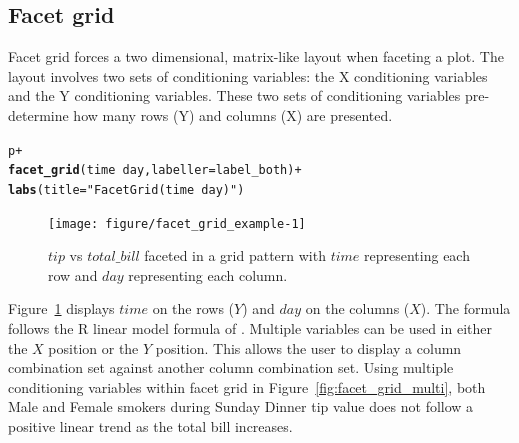 \documentclass[stat,dissertation]{puthesis}\usepackage[]{graphicx}\usepackage{xcolor}
\makeatletter
\newcommand{\hlstr}[1]{\textcolor[rgb]{0.192,0.494,0.8}{#1}}%
\newcommand{\hlopt}[1]{\textcolor[rgb]{0,0,0}{#1}}%
\newcommand{\hlstd}[1]{\textcolor[rgb]{0.345,0.345,0.345}{#1}}%
\newcommand{\hlkwc}[1]{\textcolor[rgb]{0.333,0.667,0.333}{#1}}%
\newcommand{\hlkwd}[1]{\textcolor[rgb]{0.737,0.353,0.396}{\textbf{#1}}}%
\newenvironment{kframe}{%
 \def\at@end@of@kframe{}%
 \ifinner\ifhmode%
  \def\at@end@of@kframe{\end{minipage}}%
  \begin{minipage}{\columnwidth}%
 \fi\fi%
 \def\FrameCommand##1{\hskip\@totalleftmargin \hskip-\fboxsep
 \colorbox{shadecolor}{##1}\hskip-\fboxsep
     \hskip-\linewidth \hskip-\@totalleftmargin \hskip\columnwidth}%
 \MakeFramed {\advance\hsize-\width
   \@totalleftmargin\z@ \linewidth\hsize
   \@setminipage}}%
 {\par\unskip\endMakeFramed%
 \at@end@of@kframe}
\newenvironment{knitrout}{}{} %
\renewenvironment{knitrout}{\setstretch{1}}{}
\makeatother
\begin{document}
\subsection{Facet grid}

Facet grid forces a two dimensional, matrix-like layout when faceting a plot.  The layout involves two sets of conditioning variables: the X conditioning variables and the Y conditioning variables.  These two sets of conditioning variables pre-determine how many rows (Y) and columns (X) are presented.

\newpage
\begin{knitrout}\small
{}\color{fgcolor}\begin{kframe}
\begin{alltt}
\hlstd{p} \hlopt{+}
  \hlkwd{facet_grid}\hlstd{(time} \hlopt{~} \hlstd{day,} \hlkwc{labeller} \hlstd{= label_both)} \hlopt{+}
  \hlkwd{labs}\hlstd{(}\hlkwc{title} \hlstd{=} \hlstr{"Facet Grid (time ~ day)"}\hlstd{)}
\end{alltt}
\end{kframe}\begin{figure}[H]

{\centering \texttt{[image: figure/facet\_grid\_example-1]} 

}

\caption{$tip$ vs $total\_bill$ faceted in a grid pattern with $time$ representing each row and $day$ representing each column.}\label{fig:facet_grid_example}
\end{figure}


\end{knitrout}

Figure~\ref{fig:facet_grid_example} displays $time$ on the rows ($Y$) and $day$ on the columns ($X$).  The  formula follows the R  linear model formula of .  Multiple variables can be used in either the $X$ position or the $Y$ position.  This allows the user to display a column combination set against another column combination set.  Using multiple conditioning variables within facet grid in Figure~\ref{fig:facet_grid_multi}, both Male and Female smokers during Sunday Dinner tip value does not follow a positive linear trend as the total bill increases.
\end{document}
